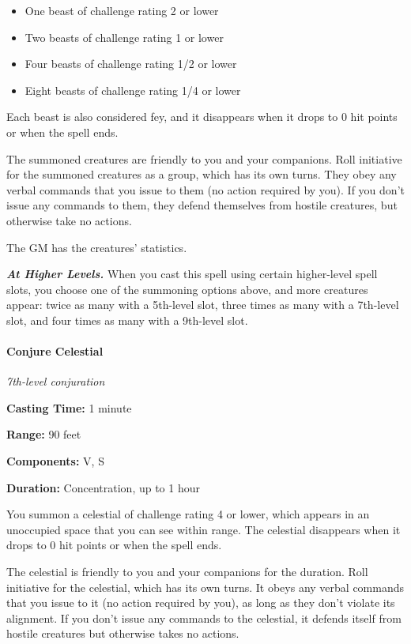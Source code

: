 \documentclass[
]{article}
\providecommand{\tightlist}{%
  \setlength{\itemsep}{0pt}\setlength{\parskip}{0pt}}
\begin{document}
\begin{itemize}
\tightlist
\item
  One beast of challenge rating 2 or lower
\item
  Two beasts of challenge rating 1 or lower
\item
  Four beasts of challenge rating 1/2 or lower
\item
  Eight beasts of challenge rating 1/4 or lower
\end{itemize}

Each beast is also considered fey, and it disappears when it drops to 0
hit points or when the spell ends.

The summoned creatures are friendly to you and your companions. Roll
initiative for the summoned creatures as a group, which has its own
turns. They obey any verbal commands that you issue to them (no action
required by you). If you don't issue any commands to them, they defend
themselves from hostile creatures, but otherwise take no actions.

The GM has the creatures' statistics.

\emph{\textbf{At Higher Levels.}} When you cast this spell using certain
higher-level spell slots, you choose one of the summoning options above,
and more creatures appear: twice as many with a 5th-level slot, three
times as many with a 7th-level slot, and four times as many with a
9th-level slot.

\hypertarget{conjure-celestial}{%
\paragraph{Conjure Celestial}\label{conjure-celestial}}

\emph{7th-level conjuration}

\textbf{Casting Time:} 1 minute

\textbf{Range:} 90 feet

\textbf{Components:} V, S

\textbf{Duration:} Concentration, up to 1 hour

You summon a celestial of challenge rating 4 or lower, which appears in
an unoccupied space that you can see within range. The celestial
disappears when it drops to 0 hit points or when the spell ends.

The celestial is friendly to you and your companions for the duration.
Roll initiative for the celestial, which has its own turns. It obeys any
verbal commands that you issue to it (no action required by you), as
long as they don't violate its alignment. If you don't issue any
commands to the celestial, it defends itself from hostile creatures but
otherwise takes no actions.
\end{document}

